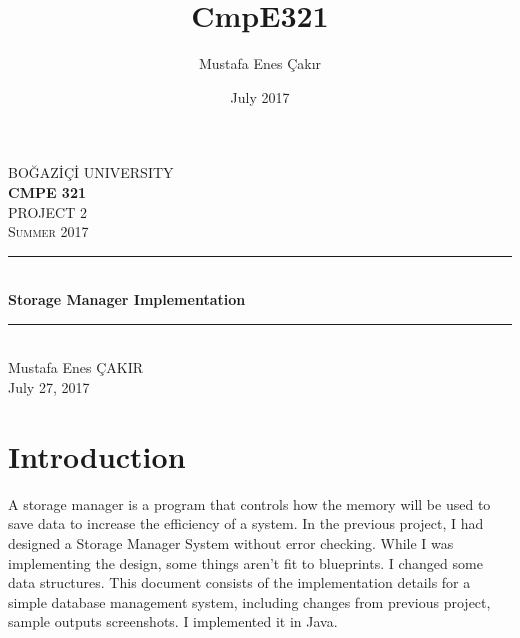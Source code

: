 \documentclass[12pt,a4paper]{article}
\title{CmpE321}
\author{Mustafa Enes Çakır}
\date{July 2017}
\begin{document}
\begin{titlepage}

\newcommand{\HRule}{\rule{\linewidth}{0.5mm}}

\center %


\textsc{\LARGE BOĞAZİÇİ UNIVERSITY}\\[1.5cm] %
\textbf{\Large CMPE 321}\\[0.5cm] %
\textsc{\large PROJECT 2}\\[2cm] %
\textsc{\large Summer 2017}\\[3cm] %


\HRule \\[0.4cm]
{ \huge \bfseries Storage Manager Implementation}\\[0.4cm] %
\HRule \\[4cm]


\Large Mustafa Enes ÇAKIR \\ [2cm] %


{\large July 27, 2017}\\[2cm] %
\vfill %
\end{titlepage}

\tableofcontents{}

\break

\section{Introduction}
    A storage manager is a program that controls how the memory will be used to save data to increase the efficiency of a system.
    In the previous project, I had designed a Storage Manager System without error checking. While I was implementing the design, some things aren't fit to blueprints. I changed some data structures. This document consists of the implementation details for a simple database management system, including changes from previous project, sample outputs screenshots.
    I implemented it in Java.
\end{document}

